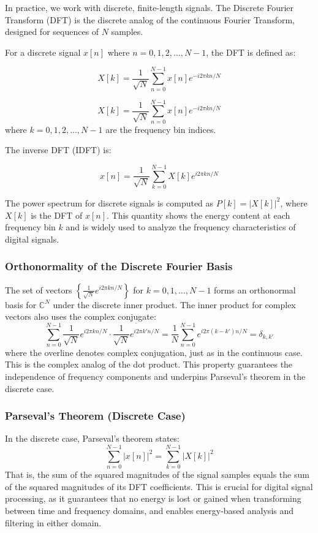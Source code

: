 \documentclass[11pt,a4paper]{article}
\begin{document}
In practice, we work with discrete, finite-length signals. The Discrete Fourier Transform (DFT) is the discrete analog of the continuous Fourier Transform, designed for sequences of $N$ samples.

For a discrete signal $x[n]$ where $n = 0, 1, 2, \ldots, N-1$, the DFT is defined as:

\begin{equation}
X[k] = \frac{1}{\sqrt{N}} \sum_{n=0}^{N-1} x[n] e^{-i 2\pi k n / N}
\end{equation}

\[
X[k] = \frac{1}{\sqrt{N}} \sum_{n=0}^{N-1} x[n] e^{-i 2\pi k n / N}
\]
where $k = 0, 1, 2, \ldots, N-1$ are the frequency bin indices.

The inverse DFT (IDFT) is:

\begin{equation}
x[n] = \frac{1}{\sqrt{N}} \sum_{k=0}^{N-1} X[k] e^{i 2\pi k n / N}
\end{equation}

The power spectrum for discrete signals is computed as $P[k] = |X[k]|^2$, where $X[k]$ is the DFT of $x[n]$. This quantity shows the energy content at each frequency bin $k$ and is widely used to analyze the frequency characteristics of digital signals.

\subsubsection*{Orthonormality of the Discrete Fourier Basis}
The set of vectors $\left\{\frac{1}{\sqrt{N}} e^{i2\pi k n/N}\right\}$ for $k=0,1,\ldots,N-1$ forms an orthonormal basis for $\mathbb{C}^N$ under the discrete inner product. The inner product for complex vectors also uses the complex conjugate:
\begin{equation}
\sum_{n=0}^{N-1} \frac{1}{\sqrt{N}} e^{i2\pi k n/N} \cdot \overline{\frac{1}{\sqrt{N}} e^{i2\pi k' n/N}} = \frac{1}{N} \sum_{n=0}^{N-1} e^{i2\pi (k-k') n/N} = \delta_{k,k'}
\end{equation}
where the overline denotes complex conjugation, just as in the continuous case. This is the complex analog of the dot product. This property guarantees the independence of frequency components and underpins Parseval's theorem in the discrete case.

\subsubsection*{Parseval's Theorem (Discrete Case)}
In the discrete case, Parseval's theorem states:
\begin{equation}
\sum_{n=0}^{N-1} |x[n]|^2 = \sum_{k=0}^{N-1} |X[k]|^2
\end{equation}
That is, the sum of the squared magnitudes of the signal samples equals the sum of the squared magnitudes of its DFT coefficients. This is crucial for digital signal processing, as it guarantees that no energy is lost or gained when transforming between time and frequency domains, and enables energy-based analysis and filtering in either domain.
\end{document}

